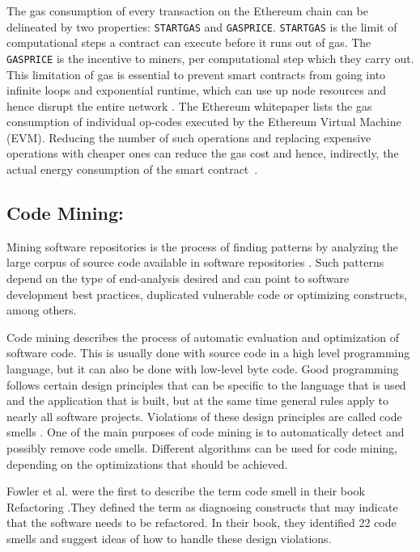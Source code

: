 \documentclass[10pt,conference]{IEEEtran}
\begin{document}
	The gas consumption of every transaction on the Ethereum chain can be delineated by two properties: \texttt{STARTGAS} and \texttt{GASPRICE}. \texttt{STARTGAS} is the limit of computational steps a contract can execute before it runs out of gas. The \texttt{GASPRICE} is the incentive to miners, per computational step which they carry out. This limitation of gas is essential to prevent smart contracts from going into infinite loops and exponential runtime, which can use up node resources and hence disrupt the entire network \cite{ethpaper}. The Ethereum whitepaper \cite{ethpaper} lists the gas consumption of individual op-codes executed by the Ethereum Virtual Machine (EVM). Reducing the number of such operations and replacing expensive operations with cheaper ones can reduce the gas cost and hence, indirectly, the actual energy consumption of the smart contract~\cite{contractenergyconsumptionthesis}.
	
	\subsection{Code Mining:}
	Mining software repositories is the process of finding patterns by analyzing the large corpus of source code available in software repositories \cite{msrllm}. Such patterns depend on the type of end-analysis desired and can point to software development best practices, duplicated vulnerable code or optimizing constructs, among others.
	
	Code mining describes the process of automatic evaluation and optimization of software code. This is usually done with source code in a high level programming language, but it can also be done with low-level byte code. Good programming follows certain design principles that can be specific to the language that is used and the application that is built, but at the same time general rules apply to nearly all software projects. Violations of these design principles are called code smells \cite{codesmellmining}. One of the main purposes of code mining is to automatically detect and possibly remove code smells. Different algorithms can be used for code mining, depending on the optimizations that should be achieved.
	
	Fowler et al. were the first to describe the term code smell in their book Refactoring \cite{refactoring}.They defined the term as diagnosing constructs that may indicate that the software needs to be refactored. In their book, they identified 22 code smells and suggest ideas of how to handle these design violations.
	
\end{document}
